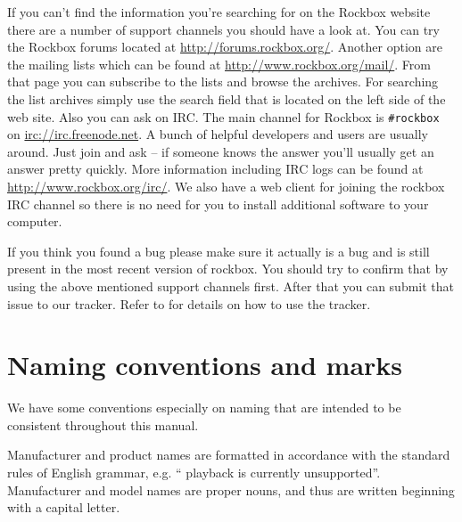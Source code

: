 If you can't find the information you're searching for on the Rockbox
website there are a number of support channels you should have a look at.
You can try the Rockbox forums located at \url{http://forums.rockbox.org/}.
Another option are the mailing lists which can be found at
\url{http://www.rockbox.org/mail/}. From that page you can subscribe to the
lists and browse the archives. For searching the list archives simply use
the search field that is located on the left side of the web site.
Also you can ask on IRC. The main channel for Rockbox is \texttt{\#rockbox}
on \url{irc://irc.freenode.net}. A bunch of helpful developers and users
are usually around. Just join and ask -- if someone knows the answer you'll
usually get an answer pretty quickly. More information including IRC logs
can be found at \url{http://www.rockbox.org/irc/}. We also have a web client
for joining the rockbox IRC channel so there is no need for you
to install additional software to your computer.

If you think you found a bug please make sure it actually is a bug and is
still present in the most recent version of rockbox. You should try to
confirm that by using the above mentioned support channels first. After that
you can submit that issue to our tracker. Refer to 
for details on how to use the tracker.


\section{Naming conventions and marks}
We have some conventions especially on naming that are intended to be
consistent throughout this manual.

Manufacturer and product names are formatted in accordance with the standard
rules of English grammar, e.g. ``\playerman{} playback is currently
unsupported''. Manufacturer and model names are proper nouns, and
thus are written beginning with a capital letter.



